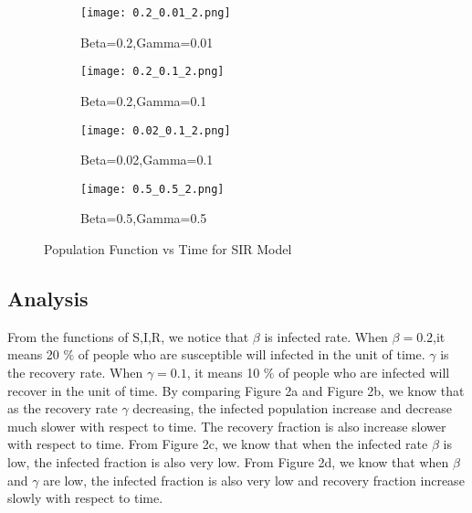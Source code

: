 \documentclass[12pt]{article}
\begin{document}
\begin{figure}[h]
\centering
\begin{subfigure}{.49\textwidth}
  \centering
  \texttt{[image: 0.2\_0.01\_2.png]}
  \caption{Beta=0.2,Gamma=0.01}
\end{subfigure}%
\begin{subfigure}{.49\textwidth}
  \centering
  \texttt{[image: 0.2\_0.1\_2.png]}
  \caption{Beta=0.2,Gamma=0.1}
 \end{subfigure}
 \begin{subfigure}{.49\textwidth}
  \centering
  \texttt{[image: 0.02\_0.1\_2.png]}
  \caption{Beta=0.02,Gamma=0.1}
 \end{subfigure}
 \begin{subfigure}{.49\textwidth}
  \centering
  \texttt{[image: 0.5\_0.5\_2.png]}
  \caption{Beta=0.5,Gamma=0.5}
 \end{subfigure}
\caption{Population Function vs Time for SIR Model}
\label{fig 2}
\end{figure}

\subsection{Analysis}
From the functions of S,I,R, we notice that $\beta$ is infected rate. When $\beta=0.2$,it means 20 $\%$ of people who are susceptible will infected in the unit of time. $\gamma$ is the recovery rate. When $\gamma=0.1$, it means 10 $\%$ of people who are infected will recover in the unit of time. By comparing Figure 2a and Figure 2b, we know that as the recovery rate $\gamma$ decreasing, the infected population increase and decrease much slower with respect to time. The recovery fraction is also increase slower with respect to time. From Figure 2c, we know that when the infected rate $\beta$ is low, the infected fraction is also very low. From Figure 2d, we know that when $\beta$ and $\gamma$ are low, the infected fraction is also very low and recovery fraction increase slowly with respect to time.
\end{document}
